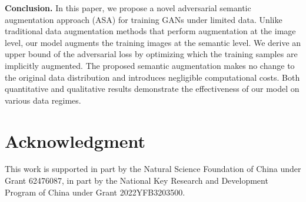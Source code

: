 \documentclass[10pt,journal,compsoc]{IEEEtran}
\begin{document}
\textbf{Conclusion.}
%
In this paper, we propose a novel adversarial semantic augmentation approach (ASA) for training GANs under limited data.
%
Unlike traditional data augmentation methods that perform augmentation at the image level, our model augments the training images at the semantic level.
%
We derive an upper bound of the adversarial loss by optimizing which the training samples are implicitly augmented.
%
The proposed semantic augmentation makes no change to the original data distribution and introduces negligible computational costs.
%
Both quantitative and qualitative results demonstrate the effectiveness of our model on various data regimes.
%



\section*{Acknowledgment}
This work is supported in part by the Natural Science Foundation of China under Grant 62476087, in part by the National Key Research and Development Program of China under Grant 2022YFB3203500.


\ifCLASSOPTIONcaptionsoff
  \newpage
\fi





\end{document}
